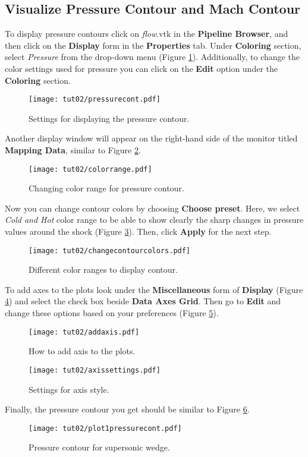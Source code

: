 \subsection{Visualize Pressure Contour and Mach Contour}
To display pressure contours click on \textit{flow}.vtk in the \textbf{Pipeline Browser}, and then click on the \textbf{Display} form in the \textbf{Properties} tab. Under \textbf{Coloring} section, select \textit{Pressure} from the drop-down menu (Figure \ref{fig2:pressure contours setting}). Additionally, to change the color settings used for  pressure you can click on the \textbf{Edit} option under the \textbf{Coloring} section.
\begin{figure}[htbp]
    \centering
    \texttt{[image: tut02/pressurecont.pdf]}
    \caption{Settings for displaying the pressure contour.}
    \label{fig2:pressure contours setting}
\end{figure}
Another display window will appear on the right-hand side of the monitor titled \textbf{Mapping Data}, similar to Figure \ref{fig2:color_range}.
\begin{figure}[htbp]
    \centering
    \texttt{[image: tut02/colorrange.pdf]}
    \caption{Changing color range for pressure contour.}
    \label{fig2:color_range}
\end{figure}
Now you can change contour colors by choosing \textbf{Choose preset}. Here, we select \textit{Cold and Hot} color range to be able to show clearly the sharp changes in pressure values around the shock (Figure \ref{fig2:color_range_item}). Then, click \textbf{Apply} for the next step.
\begin{figure}[htbp]
    \centering
    \texttt{[image: tut02/changecontourcolors.pdf]}
    \caption{Different color ranges to display contour.}
    \label{fig2:color_range_item}
\end{figure}
To add axes to the plots look under the \textbf{Miscellaneous} form of \textbf{Display} (Figure \ref{fig2:add axis}) and select the check box beside \textbf{Data Axes Grid}. Then go to \textbf{Edit} and change these options based on your preferences (Figure \ref{fig2:axis setting}).
\begin{figure}[htbp]
    \centering
    \texttt{[image: tut02/addaxis.pdf]}
    \caption{How to add axis to the plots.}
    \label{fig2:add axis}
\end{figure}
\begin{figure}[htbp]
    \centering
    \texttt{[image: tut02/axissettings.pdf]}
    \caption{Settings for axis style.}
    \label{fig2:axis setting}
\end{figure}
Finally, the pressure contour you get should be similar to Figure \ref{fig2:plot pressure cont1}.
\begin{figure}[htbp]
    \centering
    \texttt{[image: tut02/plot1pressurecont.pdf]}
    \caption{Pressure contour for supersonic wedge.}
    \label{fig2:plot pressure cont1}
\end{figure}

